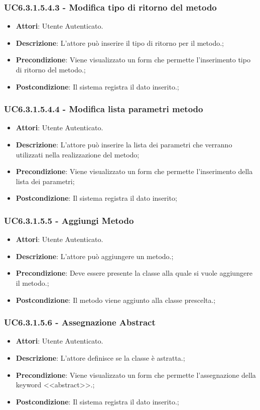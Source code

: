 \subsubsection{UC6.3.1.5.4.3 - Modifica tipo di ritorno del metodo} 
\label{sssec:UC6.3.1.5.4.3} 
\begin{itemize} 
\item \textbf{Attori}: Utente Autenticato.
\item \textbf{Descrizione}: L'attore può inserire il tipo di ritorno per il metodo.;
\item \textbf{Precondizione}: Viene visualizzato un form che permette l'inserimento tipo di ritorno del metodo.;
\item \textbf{Postcondizione}: Il sistema registra il dato inserito.;
\end{itemize} 
\subsubsection{UC6.3.1.5.4.4 - Modifica lista parametri metodo} 
\label{sssec:UC6.3.1.5.4.4} 
\begin{itemize} 
\item \textbf{Attori}: Utente Autenticato.
\item \textbf{Descrizione}: L'attore può inserire la lista dei parametri che verranno utilizzati nella realizzazione del metodo;
\item \textbf{Precondizione}: Viene visualizzato un form che permette l'inserimento della lista dei parametri;
\item \textbf{Postcondizione}: Il sistema registra il dato inserito;
\end{itemize} 
\subsubsection{UC6.3.1.5.5 - Aggiungi Metodo} 
\label{sssec:UC6.3.1.5.5} 
\begin{itemize} 
\item \textbf{Attori}: Utente Autenticato.
\item \textbf{Descrizione}: L'attore può aggiungere un metodo.;
\item \textbf{Precondizione}: Deve essere presente la classe alla quale si vuole aggiungere il metodo.;
\item \textbf{Postcondizione}: Il metodo viene aggiunto alla classe prescelta.;
\end{itemize} 
\subsubsection{UC6.3.1.5.6 - Assegnazione Abstract} 
\label{sssec:UC6.3.1.5.6} 
\begin{itemize} 
\item \textbf{Attori}: Utente Autenticato.
\item \textbf{Descrizione}: L'attore definisce se la classe è astratta.;
\item \textbf{Precondizione}: Viene visualizzato un form che permette l'assegnazione della keyword <<abstract>>.;
\item \textbf{Postcondizione}: Il sistema registra il dato inserito.;
\end{itemize} 
